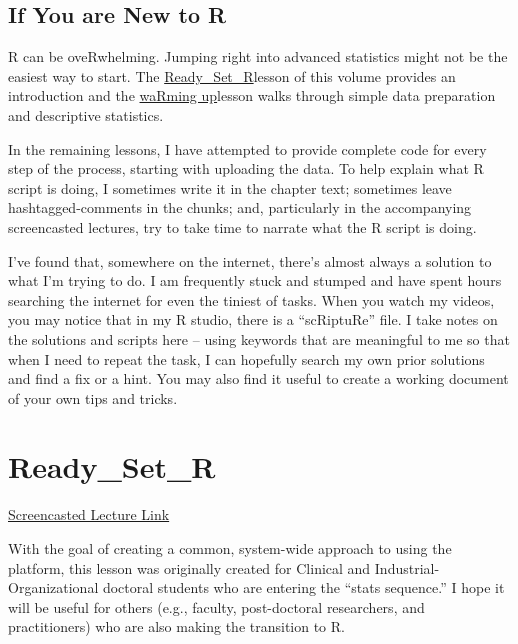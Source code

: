 \documentclass[
  11pt,
]{book}
\begin{document}
\hypertarget{if-you-are-new-to-r}{%
\section{If You are New to R}\label{if-you-are-new-to-r}}

R can be oveRwhelming. Jumping right into advanced statistics might not be the easiest way to start. The \href{https://lhbikos.github.io/ReCenterPsychStats/Ready.html}{Ready\_Set\_R}lesson of this volume provides an introduction and the \href{https://lhbikos.github.io/ReCenterPsychStats/waRmups.html}{waRming up}lesson walks through simple data preparation and descriptive statistics.

In the remaining lessons, I have attempted to provide complete code for every step of the process, starting with uploading the data. To help explain what R script is doing, I sometimes write it in the chapter text; sometimes leave hashtagged-comments in the chunks; and, particularly in the accompanying screencasted lectures, try to take time to narrate what the R script is doing.

I've found that, somewhere on the internet, there's almost always a solution to what I'm trying to do. I am frequently stuck and stumped and have spent hours searching the internet for even the tiniest of tasks. When you watch my videos, you may notice that in my R studio, there is a ``scRiptuRe'' file. I take notes on the solutions and scripts here -- using keywords that are meaningful to me so that when I need to repeat the task, I can hopefully search my own prior solutions and find a fix or a hint. You may also find it useful to create a working document of your own tips and tricks.

\hypertarget{Ready}{%
\chapter{Ready\_Set\_R}\label{Ready}}

\href{https://spu.hosted.panopto.com/Panopto/Pages/Viewer.aspx?pid=6b27a60c-edcb-4565-aaf1-ad890174586e}{Screencasted Lecture Link}

With the goal of creating a common, system-wide approach to using the platform, this lesson was originally created for Clinical and Industrial-Organizational doctoral students who are entering the ``stats sequence.'' I hope it will be useful for others (e.g., faculty, post-doctoral researchers, and practitioners) who are also making the transition to R.
\end{document}
